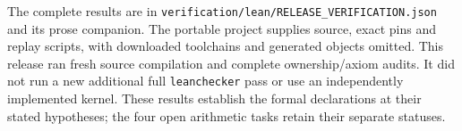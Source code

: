The complete results are in
\nolinkurl{verification/lean/RELEASE_VERIFICATION.json} and its prose companion.
The portable project supplies source, exact pins and replay scripts, with
downloaded toolchains and generated objects omitted. This release ran fresh
source compilation and complete ownership/axiom audits. It did not run a new
additional full \texttt{leanchecker} pass or use an independently implemented
kernel. These results establish the formal declarations at their stated
hypotheses; the four open arithmetic tasks retain their separate statuses.
